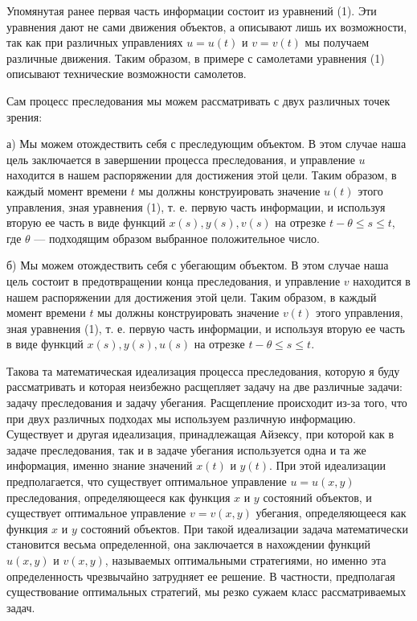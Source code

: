 \documentclass[10pt]{article}
\begin{document}
Упомянутая ранее первая часть информации состоит из уравнений (1). Эти уравнения дают не сами движения объектов, а описывают лишь их возможности, так как при различных управлениях \(u = u\left( t\right)\) и \(v = v\left( t\right)\) мы получаем различные движения. Таким образом, в примере с самолетами уравнения (1) описывают технические возможности самолетов.

Сам процесс преследования мы можем рассматривать с двух различных точек зрения:

а) Мы можем отождествить себя с преследующим объектом. В этом случае наша цель заключается в завершении процесса преследования, и управление \(u\) находится в нашем распоряжении для достижения этой цели. Таким образом, в каждый момент времени \(t\) мы должны конструировать значение \(u\left( t\right)\) этого управления, зная уравнения (1), т. е. первую часть информации, и используя вторую ее часть в виде функций \(x\left( s\right),y\left( s\right),v\left( s\right)\) на отрезке \(t - \theta  \leq  s \leq  t\), где \(\theta\) — подходящим образом выбранное положительное число.

б) Мы можем отождествить себя с убегающим объектом. В этом случае наша цель состоит в предотвращении конца преследования, и управление \(v\) находится в нашем распоряжении для достижения этой цели. Таким образом, в каждый момент времени \(t\) мы должны конструировать значение \(v\left( t\right)\) этого управления, зная уравнения (1), т. е. первую часть информации, и используя вторую ее часть в виде функций \(x\left( s\right),y\left( s\right),u\left( s\right)\) на отрезке \(t - \theta  \leq  s \leq  t\).

Такова та математическая идеализация процесса преследования, которую я буду рассматривать и которая неизбежно расщепляет задачу на две различные задачи: задачу преследования и задачу убегания. Расщепление происходит из-за того, что при двух различных подходах мы используем различную информацию. Существует и другая идеализация, принадлежащая Айзексу, при которой как в задаче преследования, так и в задаче убегания используется одна и та же информация, именно знание значений \(x\left( t\right)\) и \(y\left( t\right)\). При этой идеализации предполагается, что существует оптимальное управление \(u = u\left( {x,y}\right)\) преследования, определяющееся как функция \(x\) и \(y\) состояний объектов, и существует оптимальное управление \(v = v\left( {x,y}\right)\) убегания, определяющееся как функция \(x\) и \(y\) состояний объектов. При такой идеализации задача математически становится весьма определенной, она заключается в нахождении функций \(u\left( x, y\right)\) и \(v\left( x, y\right)\), называемых оптимальными стратегиями, но именно эта определенность чрезвычайно затрудняет ее решение. В частности, предполагая существование оптимальных стратегий, мы резко сужаем класс рассматриваемых задач.
\end{document}
